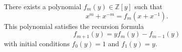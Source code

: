 There exists a polynomial $f_m(y) \in \mathbb{Z}[y]$ such that
$$
x^m + x^{-m} = f_m(x + x^{-1}).
$$
This polynomial satisfies the recursion formula
$$
f_{m+1}(y) = y f_m(y) - f_{m-1}(y)
$$
with initial conditions $f_0(y) = 1$ and $f_1(y) = y$.
